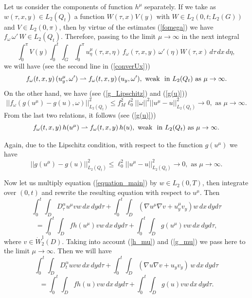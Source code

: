 \documentclass[12pt]{amsart}
\theoremstyle{definition}
\numberwithin{equation}{section}
\begin{document}
Let us consider the components of function $h^\mu$ separately. If we take as $w(\tau, x, y) \in L_2(Q_t)$ a function $W(\tau, x) V(y)$ with $W\in L_2(0, t; L_2(G))$ and $V\in L_2(0, \pi)$, then by virtue of the estimates (\ref{fomega}) we have $f_\omega \, \omega' \, W \in L_2 (Q_t)$. Therefore, passing to the limit $\mu \to \infty$ in the next integral
\[
\int_0^\pi V(y) \int_0^t \int_G \int_0^\pi  u^\mu_\eta(\tau,x, \eta)\, f_\omega (\tau, x, y)\, \omega'(\eta) W(\tau, x) \, d\tau\, dx\, d\eta,
\]
we will have (see the second line in (\ref{converUx}))
\[
 f_\omega (t, x, y)\,(u_y^\mu, \omega')   \rightharpoonup   f_\omega (t, x, y)\,(u_y, \omega'), \,\, \text{weak\,\, in} \,\, L_2(Q_t)\,\, \text{as}\,\, \mu\to \infty.
\]
On the other hand, we have (see (\ref{g_Lipschitz}) and (\ref{g(u)}))
\[
    ||f_\omega (g(u^\mu) - g(u), \omega)||^2_{L_2(Q_t)} \leq f_M^2 \ell_0^2 ||\omega||^2 ||u^\mu- u||^2_{L_2(Q_t)} \to 0, \,\, \text{as}\,\, \mu\to \infty.
\]
From the last two relations, it follows (see  (\ref{g(u)}))
\begin{equation}\label{h_mu}
f_\omega (t, x, y)\,h(u^\mu)   \rightharpoonup   f_\omega (t, x, y)\,h(u), \,\, \text{weak\,\, in} \,\, L_2(Q_t)\,\, \text{as}\,\, \mu\to \infty.
\end{equation}

Again, due to the Lipschitz condition, with respect to the function $g(u^\mu)$ we have
\begin{equation}\label{g_mu}
    ||g(u^\mu) - g(u)||^2_{L_2(Q_t)} \leq  \ell_0^2  ||u^\mu- u||^2_{L_2(Q_t)} \to 0, \,\, \text{as}\,\, \mu\to \infty.
\end{equation}

Now let us multiply equation (\ref{equation_main}) by $w\in L_2(0, T)$, then integrate over $(0,t)$ and rewrite the resulting equation with respect to $u^\mu$. Then
\[
    \int_0^t\int_D D_\tau^\alpha u^\mu v w\, dx \, dy d\tau+ \int_0^t\int_D (\nabla u^\mu \nabla v  + u^\mu_y v_y) w\, dx \, dy d\tau 
    \]
\[
        = \int_0^t\int_D f h(u^\mu) v w \, dx \, dy  d\tau + \int_0^t\int_D g(u^\mu) v w\, dx \, dy d\tau ,
   \]
where $v\in \dot{W}_2^1(D)$. 
Taking into account (\ref{h_mu}) and (\ref{g_mu}) we pass here to the limit  $\mu \to \infty$. Then we will have
\begin{equation}\label{equation_mainT}
    \int_0^t \int_D D_t^\alpha u v w\, dx \, dy d\tau +  \int_0^t\int_D (\nabla u \nabla v + u_y v_y) \, w\, dx \, dy d\tau
    \end{equation}
    \[
    =  \int_0^t\int_D f h (u) v w\, dx \, dy d\tau +  \int_0^t\int_D g(u) v w\, dx \, dy d\tau.
\]
\end{document}
